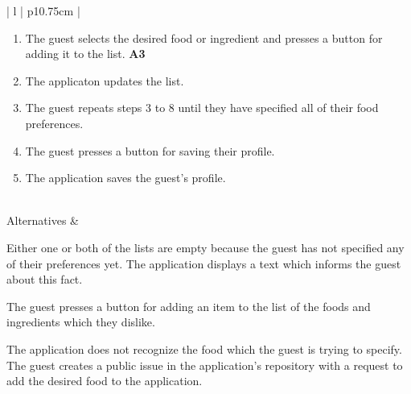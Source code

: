 \begin{center}
\begin{tabular}{| l | p{10.75cm} | }
\begin{minipage}[t]{\linewidth}
\begin{enumerate}[leftmargin=*,nosep,before=\vspace{-0.575\baselineskip},after=\strut]
        \item The guest selects the desired food or ingredient and presses a button for adding it to the list. \textbf{A3}
        \item The applicaton updates the list.
        \item The guest repeats steps 3 to 8 until they have specified all of their food preferences.
        \item The guest presses a button for saving their profile.
        \item The application saves the guest's profile. 
      \end{enumerate}
    \end{minipage}
    \\
    \hline
    Alternatives &
    \begin{minipage}[t]{\linewidth}
      \begin{description}[nosep,after=\strut]
        \item [A1:] Either one or both of the lists are empty because the guest has not specified any of their preferences yet. The application displays a text which informs the guest about this fact.
        \item [A2:] The guest presses a button for adding an item to the list of the foods and ingredients which they dislike.
        \item [A3:] The application does not recognize the food which the guest is trying to specify. The guest creates a public issue in the application's repository with a request to add the desired food to the application.
      \end{description}
    \end{minipage}
    \\
    \hline
  \end{tabular}
  \newline
\end{center}

\newpage

